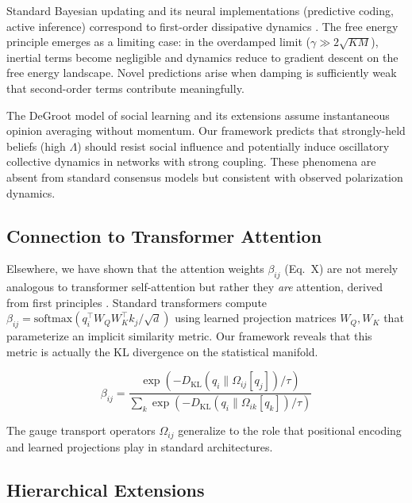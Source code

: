 \documentclass[12pt]{article}
\begin{document}
Standard Bayesian updating and its neural implementations (predictive coding, active inference) correspond to first-order dissipative dynamics \citet{friston2010, bogacz2017tutorial}. The free energy principle emerges as a limiting case: in the overdamped limit ($\gamma \gg 2\sqrt{KM}$), inertial terms become negligible and dynamics reduce to gradient descent on the free energy landscape. Novel predictions arise when damping is sufficiently weak that second-order terms contribute meaningfully.

The DeGroot model of social learning \citet{degroot1974} and its extensions assume instantaneous opinion averaging without momentum. Our framework predicts that strongly-held beliefs (high $\Lambda$) should resist social influence and potentially induce oscillatory collective dynamics in networks with strong coupling.  These phenomena are absent from standard consensus models but consistent with observed polarization dynamics.

\subsection{Connection to Transformer Attention}

Elsewhere, we have shown that the attention weights $\beta_{ij}$ (Eq.~X) are not merely analogous to transformer self-attention but rather they \emph{are} attention, derived from first principles \citet{Dennis2025, Dennis2025b}. Standard transformers compute $\beta_{ij} = \mathrm{softmax}(q_i^\top W_Q W_K^\top k_j / \sqrt{d})$ using learned projection matrices $W_Q, W_K$ that parameterize an implicit similarity metric. Our framework reveals that this metric is actually the KL divergence on the statistical manifold.

\begin{equation}
\beta_{ij} = \frac{\exp(-D_{\mathrm{KL}}(q_i \| \Omega_{ij}[q_j])/\tau)}{\sum_k \exp(-D_{\mathrm{KL}}(q_i \| \Omega_{ik}[q_k])/\tau)}
\end{equation}

The gauge transport operators $\Omega_{ij}$ generalize to the role that positional 
encoding and learned projections play in standard architectures. 


\subsection{Hierarchical Extensions}
\end{document}
